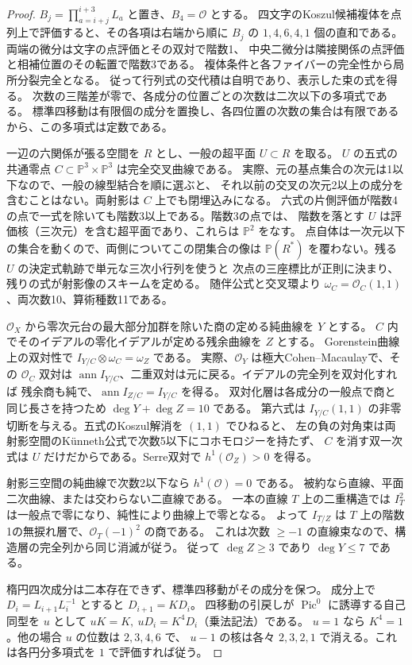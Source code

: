 \begin{proof}
$B_j=\prod_{a=i+j}^{i+3} L_a$ と置き、$B_4=\mathcal O$ とする。
四文字のKoszul候補複体を点列上で評価すると、その各項は右端から順に
$B_j$ の $1,4,6,4,1$ 個の直和である。両端の微分は文字の点評価とその双対で階数1、
中央二微分は隣接関係の点評価と相補位置のその転置で階数3である。
複体条件と各ファイバーの完全性から局所分裂完全となる。
従って行列式の交代積は自明であり、表示した束の式を得る。
次数の三階差が零で、各成分の位置ごとの次数は二次以下の多項式である。
標準四移動は有限個の成分を置換し、各四位置の次数の集合は有限であるから、この多項式は定数である。

一辺の六関係が張る空間を $R$ とし、一般の超平面 $U\subset R$ を取る。
$U$ の五式の共通零点 $C\subset\mathbb P^3\times\mathbb P^3$ は完全交叉曲線である。
実際、元の基点集合の次元は1以下なので、一般の線型結合を順に選ぶと、
それ以前の交叉の次元2以上の成分を含むことはない。両射影は $C$ 上でも閉埋込みになる。
六式の片側評価が階数4の点で一式を除いても階数3以上である。階数3の点では、
階数を落とす $U$ は評価核（三次元）を含む超平面であり、これらは $\mathbb P^2$ をなす。
点自体は一次元以下の集合を動くので、両側についてこの閉集合の像は
$\mathbb P(R^*)$ を覆わない。残る $U$ の決定式軌跡で単元な三次小行列を使うと
次点の三座標比が正則に決まり、残りの式が射影像のスキームを定める。
随伴公式と交叉環より $\omega_C=\mathcal O_C(1,1)$、両次数10、算術種数11である。

$\mathcal O_X$ から零次元台の最大部分加群を除いた商の定める純曲線を $Y$ とする。
$C$ 内でそのイデアルの零化イデアルが定める残余曲線を $Z$ とする。
Gorenstein曲線上の双対性で $I_{Y/C}\otimes\omega_C=\omega_Z$ である。
実際、$\mathcal O_Y$ は極大Cohen--Macaulayで、その $\mathcal O_C$ 双対は
$\operatorname{ann} I_{Y/C}$、二重双対は元に戻る。イデアルの完全列を双対化すれば
残余商も純で、$\operatorname{ann} I_{Z/C}=I_{Y/C}$ を得る。
双対化層は各成分の一般点で商と同じ長さを持つため $\deg Y+\deg Z=10$ である。
第六式は $I_{Y/C}(1,1)$ の非零切断を与える。五式のKoszul解消を $(1,1)$ でひねると、
左の負の対角束は両射影空間のKünneth公式で次数5以下にコホモロジーを持たず、
$C$ を消す双一次式は $U$ だけだからである。Serre双対で $h^1(\mathcal O_Z)>0$ を得る。

射影三空間の純曲線で次数2以下なら $h^1(\mathcal O)=0$ である。
被約なら直線、平面二次曲線、または交わらない二直線である。
一本の直線 $T$ 上の二重構造では $I_T^2$ は一般点で零になり、純性により曲線上で零となる。
よって $I_{T/Z}$ は $T$ 上の階数1の無捩れ層で、$\mathcal O_T(-1)^2$ の商である。
これは次数 $\ge-1$ の直線束なので、構造層の完全列から同じ消滅が従う。
従って $\deg Z\ge3$ であり $\deg Y\le7$ である。

楕円四次成分は二本存在できず、標準四移動がその成分を保つ。
成分上で $D_i=L_{i+1}L_i^{-1}$ とすると $D_{i+1}=K D_i$。
四移動の引戻しが $\operatorname{Pic}^0$ に誘導する自己同型を $u$ として
$uK=K,\ uD_i=K^4D_i$（乗法記法）である。
$u=1$ なら $K^4=1$。他の場合 $u$ の位数は $2,3,4,6$ で、
$u-1$ の核は各々 $2,3,2,1$ で消える。これは各円分多項式を $1$ で評価すれば従う。
\end{proof}

